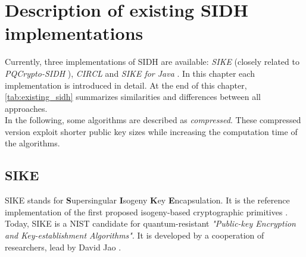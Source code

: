 \chapter{Description of existing \gls{SIDH} implementations}\label{chapter:existing_sidh}
Currently, three implementations of \gls{SIDH} are available: \textit{\gls{SIKE}} \parencite{sike2020spec} (closely related to \textit{\gls{PQCrypto-SIDH}} \parencite{microsoft2020sidh}), \textit{\gls{CIRCL}} \parencite{circl2020github} and \textit{SIKE for Java} \parencite{SikeForJava2020github}. In this chapter each implementation is introduced in detail. At the end of this chapter, \autoref{tab:existing_sidh} summarizes similarities and differences between all approaches.
\\
In the following, some algorithms are described as \textit{compressed}. These compressed version exploit shorter public key sizes while increasing the computation time of the algorithms.

\section{\gls{SIKE}}
\gls{SIKE} stands for \textbf{S}upersingular \textbf{I}sogeny \textbf{K}ey \textbf{E}ncapsulation. It is the reference implementation of the first proposed isogeny-based cryptographic primitives \parencite{jao2011towards}. Today, \gls{SIKE} is a \gls{NIST} candidate for quantum-resistant \textit{"Public-key Encryption and Key-establishment Algorithms"}. It is developed by a cooperation of researchers, lead by David Jao \parencite{sike2020spec}.
